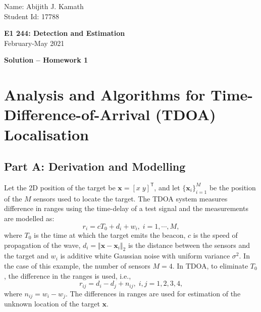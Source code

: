 \documentclass[11pt]{article}
\newcommand{\bx}{\mathbf{x}}
\newcommand{\TT}{\mathsf{T}}
\begin{document}
\thispagestyle{empty}

{\small
\begin{flushleft}
   Name: Abijith J. Kamath\\
   Student Id: 17788
\end{flushleft}
}
\vspace{2ex}
\begin{center}
    {\Large\bf E1 244: Detection and Estimation}\\
    February-May 2021

\vspace{5mm}
{\bf Solution -- Homework 1}
\end{center}
\vspace{5mm}

\section*{Analysis and Algorithms for Time-Difference-of-Arrival (TDOA) Localisation}


\subsection*{Part A: Derivation and Modelling}
\label{subsec:partA}

Let the 2D position of the target be $\bx = [x \; y]^{\TT}$, and let $\{\bx_{i}\}_{i=1}^{M}$ be the position of the $M$ sensors used to locate the target. The TDOA system measures difference in ranges using the time-delay of a test signal and the measurements are modelled as:
\begin{equation}
	r_{i} = cT_{0} + d_{i} + w_{i}, \; i=1,\cdots,M,
\label{eq:signalModel}
\end{equation}
where $T_{0}$ is the time at which the target emits the beacon, $c$ is the speed of propagation of the wave, $d_{i} = \Vert \bx-\bx_{i} \Vert_{2}$ is the distance between the sensors and the target and $w_{i}$ is additive white Gaussian noise with uniform variance $\sigma^{2}$. In the case of this example, the number of sensors $M=4$. In TDOA, to eliminate $T_{0}$, the difference in the ranges is used, i.e.,
\begin{equation}
	r_{ij} = d_{i} - d_{j} + n_{ij}, \; i,j=1,2,3,4,
\label{eq:measurementModel}
\end{equation}
where $n_{ij} = w_{i}-w_{j}$. The differences in ranges are used for estimation of the unknown location of the target $\bx$. \\
\end{document}
